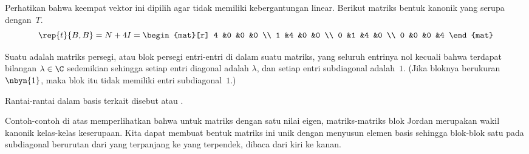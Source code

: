 \begin{example}
\begin{equation*}
\end{equation*}
Perhatikan bahwa keempat vektor ini dipilih agar tidak memiliki kebergantungan linear.
Berikut matriks bentuk kanonik yang serupa dengan~$T$.
\begin{equation*}
  \rep{t}{B,B}
  =N+4I=
  \begin{mat}[r]
    4  &0  &0  &0   \\
    1  &4  &0  &0   \\
    0  &1  &4  &0   \\
    0  &0  &0  &4
   \end{mat}
\end{equation*}
\end{example}

\begin{definition}  \label{def:JordanBlock}
Suatu 
adalah matriks persegi, atau blok persegi entri-entri di dalam suatu matriks,
yang seluruh entrinya nol kecuali bahwa
terdapat bilangan $\lambda\in\C$ sedemikian sehingga
setiap entri diagonal adalah $\lambda$,
dan setiap entri subdiagonal adalah~$1$.
(Jika bloknya berukuran $\nbyn{1}$, maka blok itu tidak memiliki entri subdiagonal~$1$.)
\end{definition}

Rantai-rantai dalam basis terkait disebut
atau .

Contoh-contoh di atas memperlihatkan bahwa untuk matriks
dengan satu nilai eigen, matriks-matriks blok Jordan merupakan
wakil kanonik kelas-kelas keserupaan.
Kita dapat membuat bentuk matriks ini unik dengan
menyusun elemen basis sehingga blok-blok satu pada subdiagonal berurutan dari
yang terpanjang ke yang terpendek, dibaca dari kiri ke kanan.

